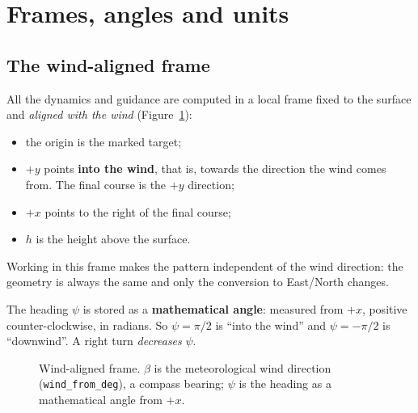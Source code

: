 \documentclass[11pt,a4paper]{article}
\newcommand{\code}[1]{\texttt{#1}}
\begin{document}
\section{Frames, angles and units}\label{sec:frames}

\subsection{The wind-aligned frame}

All the dynamics and guidance are computed in a local frame fixed to the
surface and \emph{aligned with the wind} (Figure~\ref{fig:frame}):
\begin{itemize}
\item the origin is the marked target;
\item $+y$ points \textbf{into the wind}, that is, towards the direction the
wind comes from. The final course is the $+y$ direction;
\item $+x$ points to the right of the final course;
\item $h$ is the height above the surface.
\end{itemize}
Working in this frame makes the pattern independent of the wind direction: the
geometry is always the same and only the conversion to East/North changes.

The heading $\psi$ is stored as a \textbf{mathematical angle}: measured from
$+x$, positive counter-clockwise, in radians. So $\psi=\pi/2$ is ``into the
wind'' and $\psi=-\pi/2$ is ``downwind''. A right turn \emph{decreases} $\psi$.

\begin{figure}[H]
\centering
{}
\caption{Wind-aligned frame. $\beta$ is the meteorological wind direction
(\code{wind\_from\_deg}), a compass bearing; $\psi$ is the heading as a
mathematical angle from $+x$.}
\label{fig:frame}
\end{figure}
\end{document}
